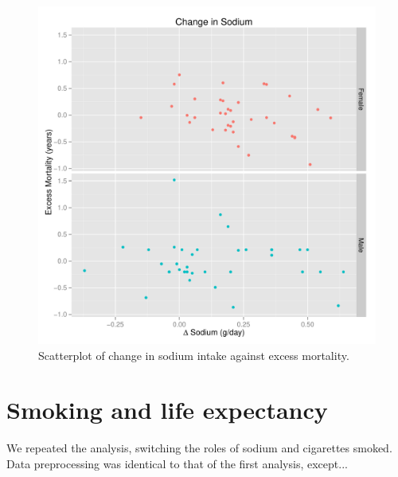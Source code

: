 \documentclass{article}
\begin{document}
\begin{figure}
\centering
\includegraphics[scale = 0.5]{sodium_exmort.pdf}
\caption{Scatterplot of change in sodium intake against excess mortality.}\label{fig:sodium_excessmortality}
\end{figure}

\section{Smoking and life expectancy}
We repeated the analysis, switching the roles of sodium and cigarettes smoked.  Data preprocessing was identical to that of the first analysis, except...
\end{document}
